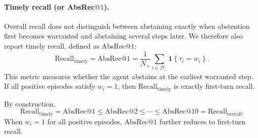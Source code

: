 \documentclass{article}
\newcommand{\ind}[1]{\mathbf{1}\!\left\{#1\right\}}
\begin{document}
\paragraph{Timely recall (or AbsRec$@1$).}
Overall recall does not distinguish between abstaining exactly when abstention first becomes warranted and abstaining several steps later. We therefore also report timely recall, defined as AbsRec@$1$:
\begin{equation}
\mathrm{Recall}_{\mathrm{timely}}
=
\mathrm{AbsRec}@1
=
\frac{1}{N_{+}}
\sum_{i \in \mathcal{D}_{+}}
\ind{\tau_i = w_i}.
\label{eq:recall_timely}
\end{equation}
This metric measures whether the agent abstains at the earliest warranted step. If all positive episodes satisfy $w_i=1$, then $\mathrm{Recall}_{\mathrm{timely}}$ is exactly first-turn recall.

By construction,
\begin{equation}
\mathrm{Recall}_{\mathrm{timely}}
=
\mathrm{AbsRec}@1
\le
\mathrm{AbsRec}@2
\le
\cdots
\le
\mathrm{AbsRec}@10
=
\mathrm{Recall}_{\mathrm{overall}}.
\label{eq:absrec_relation}
\end{equation}
When $w_i=1$ for all positive episodes, AbsRec@$1$ further reduces to first-turn recall.


\end{document}

